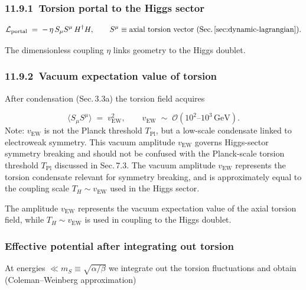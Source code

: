 \documentclass{article}
\newcommand{\vEW}{\ensuremath{v_{\mathrm{EW}}}}
\begin{document}
\subsubsection*{11.9.1 Torsion portal to the Higgs sector}

\begin{equation}
  \mathcal L_{\text{portal}}
  \;=\;
  -\,\eta\,
  S_{\mu}S^{\mu}\,
  H^{\dagger}H,
  \qquad
  S^{\mu}\equiv\text{axial torsion vector (Sec.\,\ref{sec:dynamic-lagrangian})}.
  \label{eq:portal}
\end{equation}

The dimensionless coupling $\eta$ links geometry to the Higgs doublet.

\subsubsection*{11.9.2 Vacuum expectation value of torsion}

After condensation (Sec.\,3.3a) the torsion field acquires

\begin{equation}\label{eq:auto121}
\langle S_{\mu}S^{\mu}\rangle \;=\; v_{\text{EW}}^{2},
  \qquad
  v_{\text{EW}}\;\sim\;\mathcal O(10^{2}\text{--}10^{3}\,\mathrm{GeV}).
\end{equation}
Note: $v_{\text{EW}}$ is not the Planck threshold $T_{\mathrm{Pl}}$, but a low-scale condensate linked to electroweak symmetry.
This vacuum amplitude $v_{\text{EW}}$
 governs Higgs-sector symmetry breaking and should not be confused with the Planck-scale torsion threshold $T_{\mathrm{Pl}}$ discussed in Sec. 7.3.
The vacuum amplitude $v_{\text{EW}}$ represents the torsion condensate relevant for symmetry breaking, and is approximately equal to the coupling scale $T_H \sim v_{\text{EW}}$ used in the Higgs sector.


 The amplitude $\vEW$ represents the vacuum expectation value of the axial torsion field, while $T_H \sim \vEW$ is used in coupling to the Higgs doublet.
\subsubsection { Effective potential after integrating out torsion}

At energies $\ll m_{S}\equiv\sqrt{\alpha/\beta}$ we integrate out the
torsion fluctuations and obtain (Coleman–Weinberg approximation)
\end{document}

